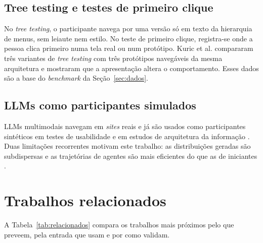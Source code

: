 \documentclass[12pt]{article}
\begin{document}
\subsection{Tree testing e testes de primeiro clique}
No \textit{tree testing}, o participante navega por uma versão só em texto da hierarquia de menus, sem leiaute nem estilo. No teste de primeiro clique, registra-se onde a pessoa clica primeiro numa tela real ou num protótipo. Kuric et al. \cite{kuric2025ia} compararam três variantes de \textit{tree testing} com três protótipos navegáveis da mesma arquitetura e mostraram que a apresentação altera o comportamento. Esses dados são a base do \textit{benchmark} da Seção~\ref{sec:dados}.

\subsection{LLMs como participantes simulados}
LLMs multimodais navegam em \textit{sites} reais \cite{deng2023mind2web,zhou2024webarena} e já são usados como participantes sintéticos em testes de usabilidade \cite{lu2025uxagent,tan2026avenirux,chowdhury2026amuser} e em estudos de arquitetura da informação \cite{kuric2025cardsorting}. Duas limitações recorrentes motivam este trabalho: as distribuições geradas são subdispersas \cite{kuric2026wwgc} e as trajetórias de agentes são mais eficientes do que as de iniciantes \cite{zhong2025syntheticcw}.

\section{Trabalhos relacionados}
\label{sec:relacionados}

A Tabela~\ref{tab:relacionados} compara os trabalhos mais próximos pelo que preveem, pela entrada que usam e por como validam.
\end{document}
